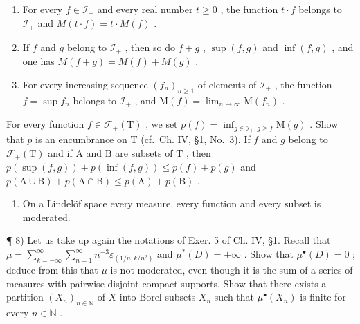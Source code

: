 \begin{enumerate}
\def\labelenumi{\alph{enumi})}
\item
  For every \(f \in \mathcal{I}_+\) and every real number \(t \geqslant 0\) , the function \(t \cdot f\) belongs to \(\mathcal{I}_+\) and \(M(t \cdot f) = t \cdot M(f)\) .
\item
  If \(f\) and \(g\) belong to \(\mathcal{I}_+\) , then so do \(f + g\) , \(\sup(f, g)\) and \(\inf(f, g)\) , and one has \(M(f + g) = M(f) + M(g)\) .
\item
  For every increasing sequence \((f_n)_{n\geqslant 1}\) of elements of \(\mathcal{I}_+\) , the function \(f = \sup f_n\) belongs to \(\mathcal{I}_+\) , and \(\mathrm{M}(f) = \lim_{n\to \infty}\mathrm{M}(f_n)\) .
\end{enumerate}

For every function \(f \in \mathcal{F}_{+}(\mathrm{T})\) , we set \(p(f) = \inf_{g \in \mathcal{I}_{+}, g \geqslant f} \mathrm{M}(g)\) . Show that \(p\) is an encumbrance on \(\mathrm{T}\) (cf.~Ch. IV, §1, No.~3). If \(f\) and \(g\) belong to \(\mathcal{F}_{+}(\mathrm{T})\) and if \(\mathrm{A}\) and \(\mathrm{B}\) are subsets of \(\mathrm{T}\) , then \(p(\sup(f, g)) + p(\inf(f, g)) \leqslant p(f) + p(g)\) and \(p(\mathrm{A} \cup \mathrm{B}) + p(\mathrm{A} \cap \mathrm{B}) \leqslant p(\mathrm{A}) + p(\mathrm{B})\) .

\begin{enumerate}
\def\labelenumi{\arabic{enumi})}
\setcounter{enumi}{6}
\tightlist
\item
  On a Lindelöf space every measure, every function and every subset is moderated.
\end{enumerate}

¶ 8) Let us take up again the notations of Exer. 5 of Ch. IV, §1. Recall that \(\mu = \sum_{k=-\infty}^{\infty} \sum_{n=1}^{\infty} n^{-3} \varepsilon_{(1/n,k/n^2)}\) and \(\mu^{*}(D) = +\infty\) . Show that \(\mu^{\bullet}(D) = 0\) ; deduce from this that \(\mu\) is not moderated, even though it is the sum of a series of measures with pairwise disjoint compact supports. Show that there exists a partition \((X_n)_{n \in \mathbb{N}}\) of \(X\) into Borel subsets \(X_n\) such that \(\mu^{\bullet}(X_n)\) is finite for every \(n \in \mathbb{N}\) .

